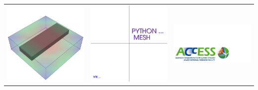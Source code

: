 \begin{table}[t]
\begin{tabular}{c c c}
\includegraphics[width=\thumbnailwidth]{figures/Rectangle} &
\includegraphics[width=\thumbnailwidth]{figures/Text} & 
\includegraphics[width=\thumbnailwidth]{figures/Logo} \\

\end{tabular}
\end{table}
